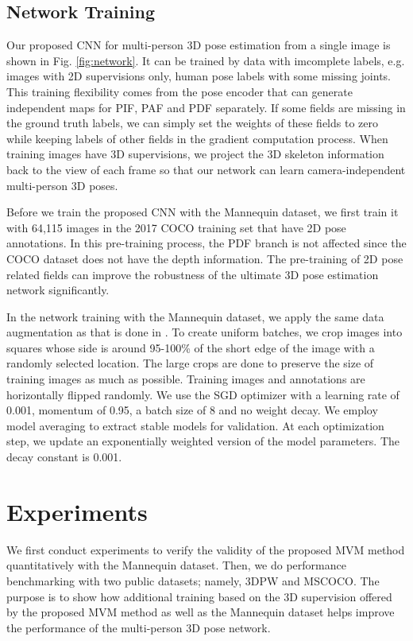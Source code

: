 \documentclass{article}
\begin{document}
\subsection{Network Training}

Our proposed CNN for multi-person 3D pose estimation from a single image
is shown in Fig.  \ref{fig:network}. It can be trained by data with
imcomplete labels, e.g. images with 2D supervisions only, human pose
labels with some missing joints. This training flexibility comes from
the pose encoder that can generate independent maps for PIF, PAF and PDF
separately. If some fields are missing in the ground truth labels, we
can simply set the weights of these fields to zero while keeping labels
of other fields in the gradient computation process.  When training
images have 3D supervisions, we project the 3D skeleton information back
to the view of each frame so that our network can learn camera-independent 
multi-person 3D poses. 

Before we train the proposed CNN with the Mannequin dataset, we first
train it with 64,115 images in the 2017 COCO training set that have 2D
pose annotations. In this pre-training process, the PDF branch is not
affected since the COCO dataset does not have the depth information.
The pre-training of 2D pose related fields can improve the robustness of
the ultimate 3D pose estimation network significantly. 

In the network training with the Mannequin dataset, we apply the same
data augmentation as that is done in \cite{kreiss2019pifpaf}. To create
uniform batches, we crop images into squares whose side is around
95-100\% of the short edge of the image with a randomly selected
location. The large crops are done to preserve the size of training
images as much as possible.  Training images and annotations are
horizontally flipped randomly. We use the SGD optimizer with a learning
rate of 0.001, momentum of 0.95, a batch size of 8 and no weight decay. We
employ model averaging to extract stable models for validation. At each
optimization step, we update an exponentially weighted version of the
model parameters. The decay constant is 0.001. 

\section{Experiments}\label{sec:experiments}

We first conduct experiments to verify the validity of the proposed MVM
method quantitatively with the Mannequin dataset.  Then, we do
performance benchmarking with two public datasets; namely, 3DPW and
MSCOCO. The purpose is to show how additional training based on the 3D
supervision offered by the proposed MVM method as well as the Mannequin
dataset helps improve the performance of the multi-person 3D pose
network. 
\end{document}
